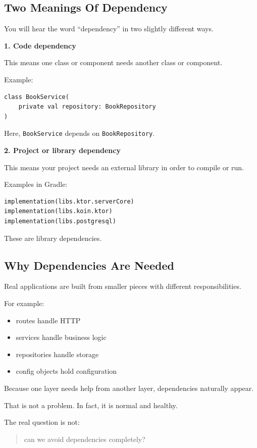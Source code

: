 \documentclass[11pt,a4paper]{article}
\begin{document}
\subsection{Two Meanings Of Dependency}

You will hear the word ``dependency'' in two slightly different ways.

\textbf{1. Code dependency}

This means one class or component needs another class or component.

Example:

\begin{lstlisting}[style=kazekotlin]
class BookService(
    private val repository: BookRepository
)
\end{lstlisting}

Here, \texttt{BookService} depends on \texttt{BookRepository}.

\textbf{2. Project or library dependency}

This means your project needs an external library in order to compile or run.

Examples in Gradle:

\begin{lstlisting}[style=kazekotlin]
implementation(libs.ktor.serverCore)
implementation(libs.koin.ktor)
implementation(libs.postgresql)
\end{lstlisting}

These are library dependencies.

\subsection{Why Dependencies Are Needed}

Real applications are built from smaller pieces with different responsibilities.

For example:
\begin{itemize}
    \item routes handle HTTP
    \item services handle business logic
    \item repositories handle storage
    \item config objects hold configuration
\end{itemize}

Because one layer needs help from another layer, dependencies naturally appear.

That is not a problem. In fact, it is normal and healthy.

The real question is not:
\begin{quote}
can we avoid dependencies completely?
\end{quote}
\end{document}
